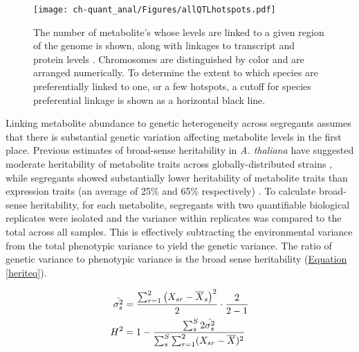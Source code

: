 \begin{figure}[h!]
\begin{center}
\texttt{[image: ch-quant\_anal/Figures/allQTLhotspots.pdf]}
\caption[Transcript, protein and metabolite QTL linkages]{The number of metabolite's whose levels are linked to a given region of the genome is shown, along with linkages to transcript and protein levels \cite{Brem:2005gh, Foss:2007ej}. Chromosomes are distinguished by color and are arranged numerically. To determine the extent to which species are preferentially linked to one, or a few hotspots, a cutoff for species preferential linkage is shown as a horizontal black line.}
\label{ch-quant_anal:qtlHotspots}
\end{center}
\end{figure}

Linking metabolite abundance to genetic heterogeneity across segregants assumes that there is substantial genetic variation affecting metabolite levels in the first place.  Previous estimates of broad-sense heritability \cite{Lynch:1998vx} in \textit{A. thaliana} have suggested moderate heritability of metabolite traits across globally-distributed strains \cite{Keurentjes:2006ik}, while segregants showed substantially lower heritability of metabolite traits than expression traits (an average of 25\% and 65\% respectively) \cite{Rowe:2008ty, West:2006bk}.  To calculate broad-sense heritability, for each metabolite, segregants with two quantifiable biological replicates were isolated and the variance within replicates was compared to the total across all samples.  This is effectively subtracting the environmental variance from the total phenotypic variance to yield the genetic variance.  The ratio of genetic variance to phenotypic variance is the broad sense heritability (\hyperref[heriteq]{Equation \ref{heriteq}}).

\large{
\begin{align}
\hat{\sigma^{2}_{s}} &= \frac{\sum_{r = 1}^{2}\left(X_{sr} - \overline{X}_{s}\right)^2}{2} \cdot \frac{2}{2 - 1}\notag\\
H^{2} &= 1 -  \frac{\sum_{s}^{S}2\hat{\sigma^{2}_{s}}}{\sum_{s}^{S}\sum_{r = 1}^{2}(X_{sr} - \overline{X})^2}\label{heriteq}
\end{align}
}

